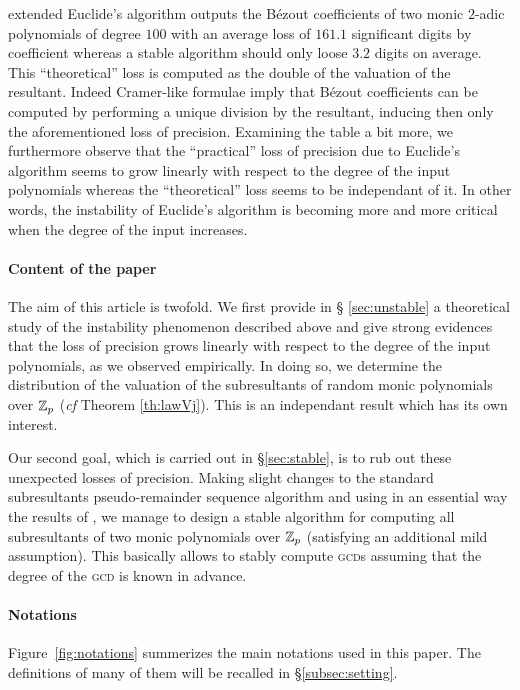 \documentclass{article}
\begin{document}
extended Euclide's algorithm outputs the B\'ezout coefficients of two 
monic $2$-adic polynomials of degree $100$ with an average loss of 
$161.1$ significant digits by coefficient whereas a stable 
algorithm should only loose $3.2$ digits on average. This 
``theoretical'' loss is computed as the double of the valuation of the 
resultant. Indeed Cramer-like formulae imply that B\'ezout coefficients 
can be computed by performing a unique division by the resultant, 
inducing then only the aforementioned loss of precision. Examining the 
table a bit more, we furthermore observe that the ``practical'' loss of 
precision due to Euclide's algorithm seems to grow linearly with respect 
to the degree of the input polynomials whereas the ``theoretical'' loss 
seems to be independant of it. In other words, the instability of 
Euclide's algorithm is becoming more and more critical when the degree 
of the input increases.

\paragraph{Content of the paper}

The aim of this article is twofold. We first provide in \S 
\ref{sec:unstable} a theoretical study of the instability phenomenon 
described above and give strong evidences that the loss of precision 
grows linearly with respect to the degree of the input polynomials, as we 
observed empirically. In doing so, we determine the distribution of the 
valuation of the subresultants of random monic polynomials over $\mathbb Z_p$ 
(\emph{cf} Theorem \ref{th:lawVj}). This is an independant result which 
has its own interest.

Our second goal, which is carried out in \S \ref{sec:stable}, is to rub 
out these unexpected losses of precision. Making slight changes to the 
standard subresultants pseudo-remainder sequence algorithm and using in 
an essential way the results of \cite{padicprec}, we manage to design a stable 
algorithm for computing all subresultants of two monic polynomials over 
$\mathbb Z_p$ (satisfying an additional mild assumption). This basically allows 
to stably compute \textsc{gcd}s assuming that the degree of the 
\textsc{gcd} is known in advance.

\paragraph{Notations}

Figure~\ref{fig:notations} summerizes the main notations used in
this paper. The definitions of many of them will be recalled in 
\S \ref{subsec:setting}.
\end{document}
